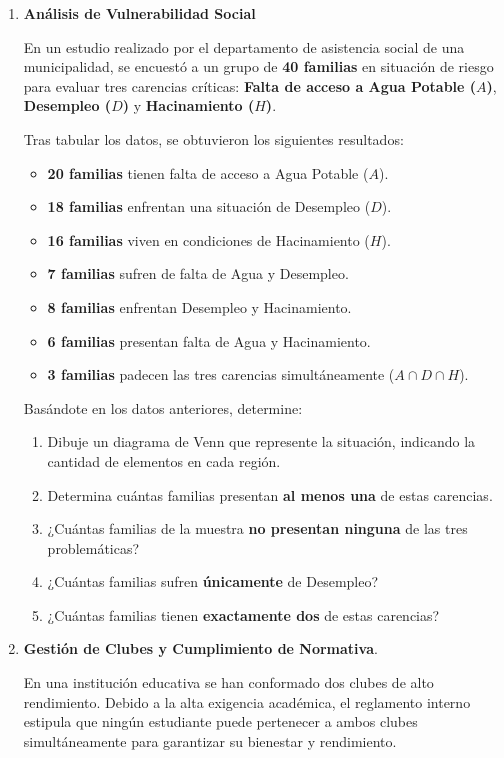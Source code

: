\documentclass[12pt]{article}
\begin{document}
\begin{enumerate}
\item \textbf{
Análisis de Vulnerabilidad Social}

En un estudio realizado por el departamento de asistencia social de una municipalidad, se encuestó a un grupo de \textbf{40 familias} en situación de riesgo para evaluar tres carencias críticas: \textbf{Falta de acceso a Agua Potable ($A$)}, \textbf{Desempleo ($D$)} y \textbf{Hacinamiento ($H$)}.

Tras tabular los datos, se obtuvieron los siguientes resultados:
\begin{itemize}
    \item \textbf{20 familias} tienen falta de acceso a Agua Potable ($A$).
    \item \textbf{18 familias} enfrentan una situación de Desempleo ($D$).
    \item \textbf{16 familias} viven en condiciones de Hacinamiento ($H$).
    \item \textbf{7 familias} sufren de falta de Agua y Desempleo.
    \item \textbf{8 familias} enfrentan Desempleo y Hacinamiento.
    \item \textbf{6 familias} presentan falta de Agua y Hacinamiento.
    \item \textbf{3 familias} padecen las tres carencias simultáneamente ($A \cap D \cap H$).
\end{itemize}
Basándote en los datos anteriores, determine:
\begin{enumerate}
    \item Dibuje un diagrama de Venn que represente la situación, indicando la cantidad de elementos en cada
región.
    \item Determina cuántas familias presentan \textbf{al menos una} de estas carencias.
    \item ¿Cuántas familias de la muestra \textbf{no presentan ninguna} de las tres problemáticas?
    \item ¿Cuántas familias sufren \textbf{únicamente} de Desempleo?
    \item ¿Cuántas familias tienen \textbf{exactamente dos} de estas carencias?
\end{enumerate}


\item \textbf{Gestión de Clubes y Cumplimiento de Normativa}.



En una institución educativa se han conformado dos clubes de alto rendimiento. 
Debido a la alta exigencia académica, el reglamento interno estipula que ningún 
estudiante puede pertenecer a ambos clubes simultáneamente para garantizar su 
bienestar y rendimiento.


\end{enumerate}
\end{document}
